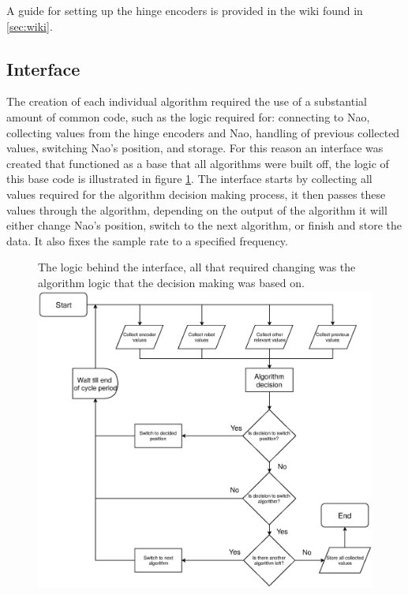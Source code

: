 \documentclass[11pt]{article}
\begin{document}
A guide for setting up the hinge encoders is provided in the wiki found in \ref{sec:wiki}.



\subsection{Interface}
The creation of each individual algorithm required the use of a substantial amount of common code, such as the logic required for: connecting to Nao, collecting values from the hinge encoders and Nao, handling of previous collected values, switching Nao's position, and storage. For this reason an interface was created that functioned as a base that all algorithms were built off, the logic of this base code is illustrated in figure \ref{InterfaceLogic}. The interface starts by collecting all values required for the algorithm decision making process, it then passes these values through the algorithm, depending on the output of the algorithm it will either change Nao's position, switch to the next algorithm, or finish and store the data. It also fixes the sample rate to a specified frequency.\\

    \begin{figure}[!htb]
        \centering
        \captionbox
             {The logic behind the interface, all that required changing was the algorithm logic that the decision making was based on.\label{InterfaceLogic}}
             {\includegraphics[width=1.0\textwidth]{InterfaceLogic.eps}}
    \end{figure}
\end{document}
